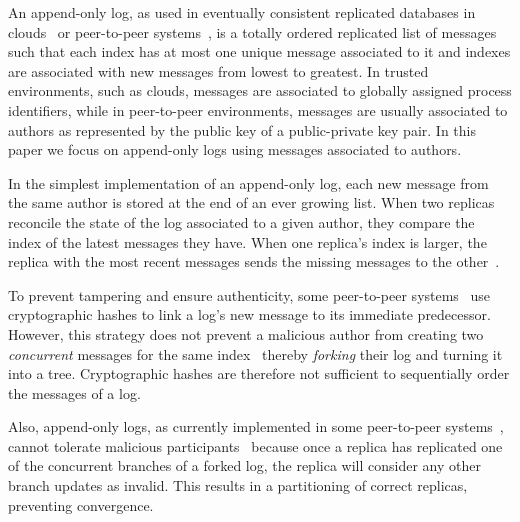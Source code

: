 \documentclass[9pt, oneside]{article}   	%
\begin{document}
An append-only log, as used in eventually consistent replicated databases in clouds~\cite{kappa-architecture,decandia2007dynamo} or peer-to-peer systems~\cite{kermarrec2020gossiping,hypercore-website}, is a totally ordered replicated list of messages such that each index has at most one unique message associated to it and indexes are associated with new messages from lowest to greatest. In trusted environments, such as clouds, messages are associated to globally assigned process identifiers, while in peer-to-peer environments, messages are usually associated to authors as represented by the public key of a public-private key pair. In this paper we focus on append-only logs using messages associated to authors.

In the simplest implementation of an append-only log, each new message from the same author is stored at the end of an ever growing list. When two replicas reconcile the state of the log associated to a given author, they compare the index of the latest messages they have. When one replica's index is larger, the replica with the most recent messages sends the missing messages to the other~\cite{vanrenesse2008scuttlebutt,kermarrec2020gossiping}. 

To prevent tampering and ensure authenticity, some peer-to-peer systems~\cite{kermarrec2020gossiping,hypercore-website} use cryptographic hashes to link a log's new message to its immediate predecessor. However, this strategy does not prevent a malicious author from creating two \textit{concurrent} messages for the same index~\cite{lavoie2023gocledger,hypercore-handling-conflicts,hypercore-split-resolution-dep} thereby \textit{forking} their log and turning it into a tree. Cryptographic hashes are therefore not sufficient to sequentially order the messages of a log.

Also, append-only logs, as currently implemented in some peer-to-peer systems~\cite{kermarrec2020gossiping,lavoie2023gocledger,hypercore-handling-conflicts,hypercore-split-resolution-dep},  cannot tolerate malicious participants~\cite{Kleppmann2022byzantine,jacob2022bft-crdt} because once a replica has replicated one of the concurrent branches of a forked log, the replica will consider any other branch updates as invalid. This results in a partitioning of correct replicas, preventing convergence.
\end{document}
